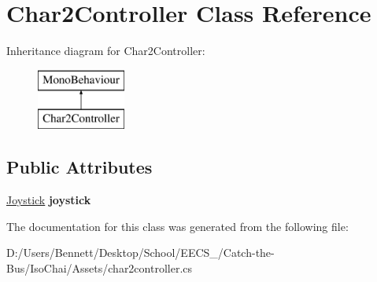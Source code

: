 \hypertarget{class_char2_controller}{}\section{Char2\+Controller Class Reference}
\label{class_char2_controller}
Inheritance diagram for Char2\+Controller\+:\begin{figure}[H]
\begin{center}
\leavevmode
\includegraphics[height=2.000000cm]{class_char2_controller}
\end{center}
\end{figure}
\subsection*{Public Attributes}
\begin{DoxyCompactItemize}
\item 
\mbox{\label{class_char2_controller_a64b557a244a9c3013032bd8221dbb076}} 
\mbox{\hyperlink{class_joystick}{Joystick}} {\bfseries joystick}
\end{DoxyCompactItemize}


The documentation for this class was generated from the following file\+:\begin{DoxyCompactItemize}
\item 
D\+:/\+Users/\+Bennett/\+Desktop/\+School/\+E\+E\+C\+S\+\_/\+Catch-\/the-\/\+Bus/\+Iso\+Chai/\+Assets/char2controller.\+cs\end{DoxyCompactItemize}
